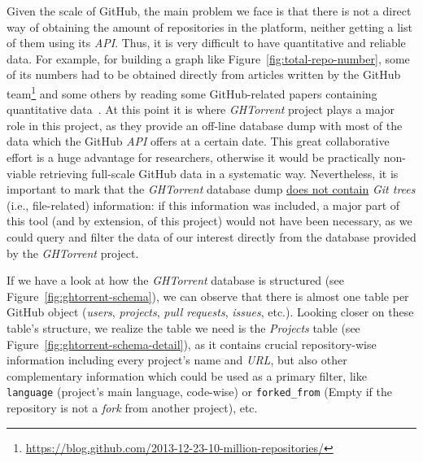 \documentclass[a4paper, 12pt]{book}
\begin{document}
Given the scale of GitHub, the main problem we face is that there is not a direct way
of obtaining the amount of repositories in the platform, neither getting a list of them using its \textit{API}.
Thus, it is
very difficult to have quantitative and reliable data. For example, for building a graph like Figure~\ref{fig:total-repo-number},
some of its numbers had to be obtained directly from articles written by the GitHub team\footnote{\url{https://blog.github.com/2013-12-23-10-million-repositories/}}
and some others by reading some GitHub-related papers containing quantitative data~\cite{Gousios:2014:LGG:2597073.2597126}.
At this point it is where \emph{GHTorrent} project plays a major role in this project, as they provide an off-line database dump with most
of the data which the GitHub \textit{API} offers at a certain date. This great collaborative effort is a huge advantage
for researchers, otherwise it would be practically non-viable retrieving full-scale GitHub data in a systematic way.
Nevertheless, it is important to mark that the \emph{GHTorrent} database dump \underline{does not contain} \textit{Git trees}
(i.e., file-related) information: if this information was included, a major part of this tool (and by extension, of this project) would not
have been necessary, as we could query and filter the data of our interest directly from the database provided by the \emph{GHTorrent} project.

If we have a look at how the \emph{GHTorrent} database is structured (see Figure~\ref{fig:ghtorrent-schema}), we can observe that
there is almost one table per GitHub object (\textit{users}, \textit{projects}, \textit{pull requests}, \textit{issues}, etc.).
Looking closer on these table's structure, we realize the table we need is the \emph{Projects} table
(see Figure~\ref{fig:ghtorrent-schema-detail}), as it contains crucial repository-wise information including every project's name
and \textit{URL}, but also other complementary information which could be used as a primary filter, like \texttt{language} (project's main language,
code-wise) or \texttt{forked\_from} (Empty if the repository is not a \textit{fork} from another project), etc.
\end{document}
